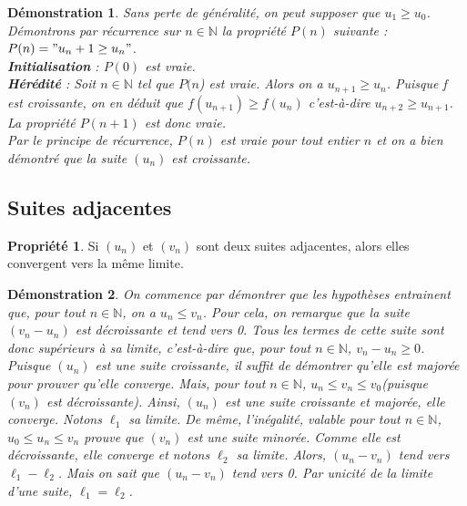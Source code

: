 \documentclass[a4paper,12pt,final]{article}
\newtheorem{Proof}{Démonstration}[section]
\theoremstyle{theorem}
\theoremstyle{definition}
\newtheorem{Propriete}{Propriété}[section]
\theoremstyle{definition}
\theoremstyle{definition}
\begin{document}
\begin{Proof}
	Sans perte de généralité, on peut supposer que $u_{1} \geq u_{0}$. Démontrons par récurrence sur $n \in \mathbb{N}$ la propriété $P(n)$ suivante : $P(n)="u_{n}+1 \geq u_{n}"$. \\
	\textbf{Initialisation }: $P(0)$ est vraie.\\
	
	\textbf{Hérédité} : Soit $n \in \mathbb{N}$ tel que $P(n$) est vraie. Alors on a $u_{n+1} \geq u_{n}$. Puisque f est croissante, on en déduit que $f(u_{n+1}) \geq f(u_{n})$ c'est-à-dire $u_{n+2} \geq u_{n+1}$. La propriété $P(n+1)$ est donc vraie. \\
	
	Par le principe de récurrence, $P(n)$ est vraie pour tout entier $n$ et on a bien démontré que la suite $(u_{n})$ est croissante.
\end{Proof}

	\subsection{Suites adjacentes}
	
\begin{Propriete}
	Si $(u_{n})$ et $(v_{n})$ sont deux suites adjacentes, alors elles convergent vers la même limite.
\end{Propriete}

\begin{Proof}
	On commence par démontrer que les hypothèses entrainent que, pour tout $n \in \mathbb{N}$, on a $u_{n} \leq v_{n}$. Pour cela, on remarque que la suite $(v_{n}−u_{n})$ est décroissante et tend vers 0. Tous les termes de cette suite sont donc supérieurs à sa limite, c'est-à-dire que, pour tout $n \in \mathbb{N}$, $v_{n}−u_{n} \geq 0$. \\
	
	Puisque $(u_{n})$ est une suite croissante, il suffit de démontrer qu'elle est majorée pour prouver qu'elle converge. Mais, pour tout $n \in \mathbb{N}$, $u_{n} \leq v_{n} \leq v_{0} $(puisque $(v_{n})$ est décroissante). Ainsi, $(u_{n})$ est une suite croissante et majorée, elle converge. Notons $\ell_{1}$ sa limite. De même, l'inégalité, valable pour tout $n \in \mathbb{N}$, $u_{0} \leq u_{n} \leq v_{n}$ prouve que $(v_{n})$ est une suite minorée. Comme elle est décroissante, elle converge et notons $\ell_{2}$ sa limite. Alors, $(u_{n}−v_{n})$ tend vers $\ell_{1}-\ell_{2}$. Mais on sait que $(u_{n}−v_{n})$ tend vers 0. Par unicité de la limite d'une suite, $\ell_{1}=\ell_{2}$.
\end{Proof}
\end{document}
